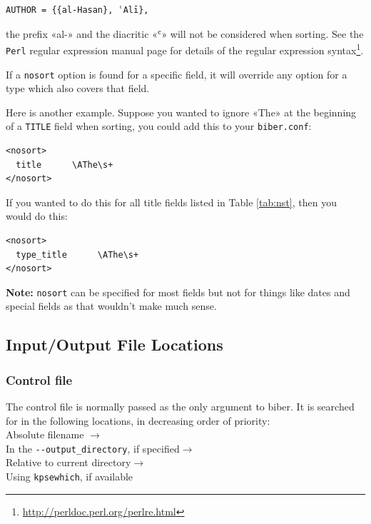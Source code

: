 \documentclass{ltxdockit}
\begin{document}
\begin{verbatim}
AUTHOR = {{al-Hasan}, ʿAlī},
\end{verbatim}

\noindent the prefix «al-» and the diacritic «ʿ» will not be considered
when sorting. See the \verb+Perl+ regular expression manual page for
details of the regular expression syntax\footnote{\url{http://perldoc.perl.org/perlre.html}}.

If a \verb+nosort+ option is found for a specific field, it will override
any option for a type which also covers that field.

Here is another example. Suppose you wanted to ignore «The» at the
beginning of a \verb+TITLE+ field when sorting, you could add this to your
\verb+biber.conf+:

\begin{verbatim}
<nosort>
  title      \AThe\s+
</nosort>
\end{verbatim}

\noindent If you wanted to do this for all title fields listed in Table
\ref{tab:nst}, then you would do this:

\begin{verbatim}
<nosort>
  type_title      \AThe\s+
</nosort>
\end{verbatim}

\noindent \textbf{Note:} \verb+nosort+ can be specified for most fields but
not for things like dates and special fields as that wouldn't make much sense.

\subsection{Input/Output File Locations}

\subsubsection{Control file}\label{loc:cf}

The control file is normally passed as the only argument to biber. It is
searched for in the following locations, in decreasing order of
priority:\\[2ex]

\noindent Absolute filename $\rightarrow$\\
\hspace*{1em}In the \verb+--output_directory+, if specified$\rightarrow$\\
\hspace*{2em}Relative to current directory$\rightarrow$\\
\hspace*{3em}Using \verb+kpsewhich+, if available
\end{document}
